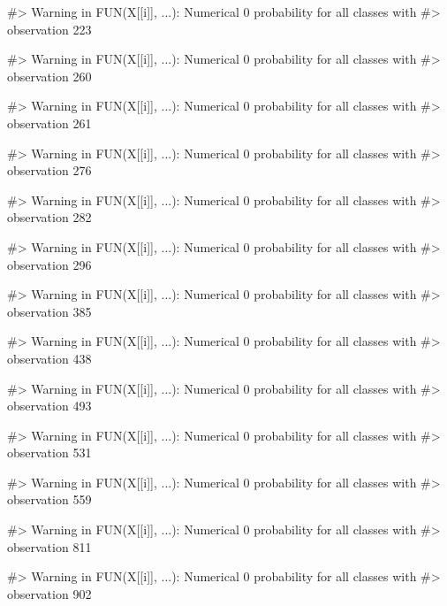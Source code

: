 \begin{Schunk}
\begin{Soutput}
#> Warning in FUN(X[[i]], ...): Numerical 0 probability for all classes with
#> observation 223
\end{Soutput}
\begin{Soutput}
#> Warning in FUN(X[[i]], ...): Numerical 0 probability for all classes with
#> observation 260
\end{Soutput}
\begin{Soutput}
#> Warning in FUN(X[[i]], ...): Numerical 0 probability for all classes with
#> observation 261
\end{Soutput}
\begin{Soutput}
#> Warning in FUN(X[[i]], ...): Numerical 0 probability for all classes with
#> observation 276
\end{Soutput}
\begin{Soutput}
#> Warning in FUN(X[[i]], ...): Numerical 0 probability for all classes with
#> observation 282
\end{Soutput}
\begin{Soutput}
#> Warning in FUN(X[[i]], ...): Numerical 0 probability for all classes with
#> observation 296
\end{Soutput}
\begin{Soutput}
#> Warning in FUN(X[[i]], ...): Numerical 0 probability for all classes with
#> observation 385
\end{Soutput}
\begin{Soutput}
#> Warning in FUN(X[[i]], ...): Numerical 0 probability for all classes with
#> observation 438
\end{Soutput}
\begin{Soutput}
#> Warning in FUN(X[[i]], ...): Numerical 0 probability for all classes with
#> observation 493
\end{Soutput}
\begin{Soutput}
#> Warning in FUN(X[[i]], ...): Numerical 0 probability for all classes with
#> observation 531
\end{Soutput}
\begin{Soutput}
#> Warning in FUN(X[[i]], ...): Numerical 0 probability for all classes with
#> observation 559
\end{Soutput}
\begin{Soutput}
#> Warning in FUN(X[[i]], ...): Numerical 0 probability for all classes with
#> observation 811
\end{Soutput}
\begin{Soutput}
#> Warning in FUN(X[[i]], ...): Numerical 0 probability for all classes with
#> observation 902
\end{Soutput}

\end{Schunk}
